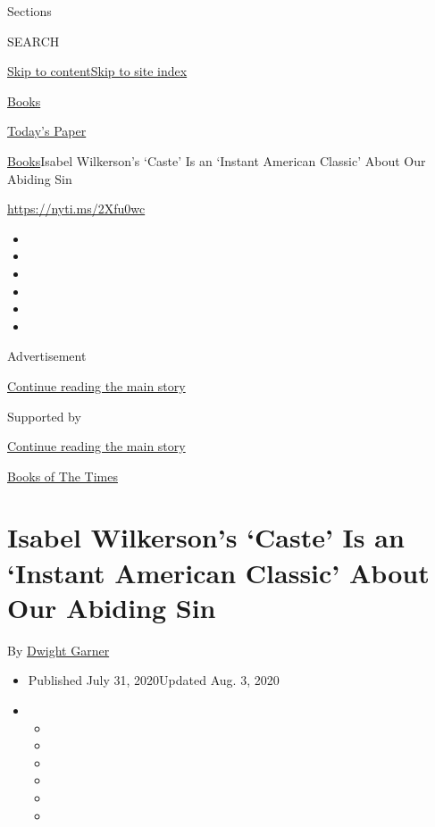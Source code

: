 Sections

SEARCH

\protect\hyperlink{site-content}{Skip to
content}\protect\hyperlink{site-index}{Skip to site index}

\href{https://www.nytimes.com/section/books}{Books}

\href{https://myaccount.nytimes.com/auth/login?response_type=cookie\&client_id=vi}{}

\href{https://www.nytimes.com/section/todayspaper}{Today's Paper}

\href{/section/books}{Books}\textbar{}Isabel Wilkerson's `Caste' Is an
`Instant American Classic' About Our Abiding Sin

\url{https://nyti.ms/2Xfu0wc}

\begin{itemize}
\item
\item
\item
\item
\item
\item
\end{itemize}

Advertisement

\protect\hyperlink{after-top}{Continue reading the main story}

Supported by

\protect\hyperlink{after-sponsor}{Continue reading the main story}

\href{/column/books-of-the-times}{Books of The Times}

\hypertarget{isabel-wilkersons-caste-is-an-instant-american-classic-about-our-abiding-sin}{%
\section{Isabel Wilkerson's `Caste' Is an `Instant American Classic'
About Our Abiding
Sin}\label{isabel-wilkersons-caste-is-an-instant-american-classic-about-our-abiding-sin}}

By \href{https://www.nytimes.com/by/dwight-garner}{Dwight Garner}

\begin{itemize}
\item
  Published July 31, 2020Updated Aug. 3, 2020
\item
  \begin{itemize}
  \item
  \item
  \item
  \item
  \item
  \item
  \end{itemize}
\end{itemize}

